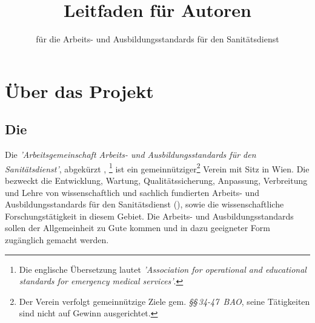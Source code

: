 \documentclass[
ngerman,
paper=a4,
asymmetric,
fontsize=10pt,
draft=false,
numbers=noenddot,
bibtotocnumbered,
footnotes=multiple,
toc=flat,
]{scrbook}
\title{Leitfaden für Autoren}
\subtitle{für die Arbeits- und Ausbildungsstandards für den
Sanitätsdienst}
\author{\AASS}
\begin{document}
 

\dominitoc
\maketitle
\tableofcontents


\chapter{Über das Projekt}

\section{Die \ARGE}



Die \emph{'Arbeitsgemeinschaft Arbeits- und
    Ausbildungsstandards für den Sanitätsdienst'}, abgekürzt {\ARGE},
    \footnote{Die englische Übersetzung lautet \emph{'Association for
    operational and
    educational standards for emergency medical services'}.}
    ist ein gemeinnütziger\footnote{Der Verein verfolgt gemeinnützige Ziele gem.
    \emph{\S\S\,34-47~BAO}, seine Tätigkeiten sind nicht auf Gewinn
    ausgerichtet.} Verein mit Sitz in Wien. 
    Die \ARGE{} bezweckt die Entwicklung, Wartung,
    Qualitätssicherung, Anpassung, Verbreitung und Lehre von wissenschaftlich und sachlich fundierten Arbeits- und
    Ausbildungsstandards für den Sanitätsdienst (\AASS{}), sowie
    die wissenschaftliche Forschungstätigkeit in diesem
    Gebiet. Die Arbeits- und Ausbildungsstandards sollen der
    Allgemeinheit zu Gute kommen und in dazu geeigneter Form
    zugänglich gemacht werden.
    
\end{document}
